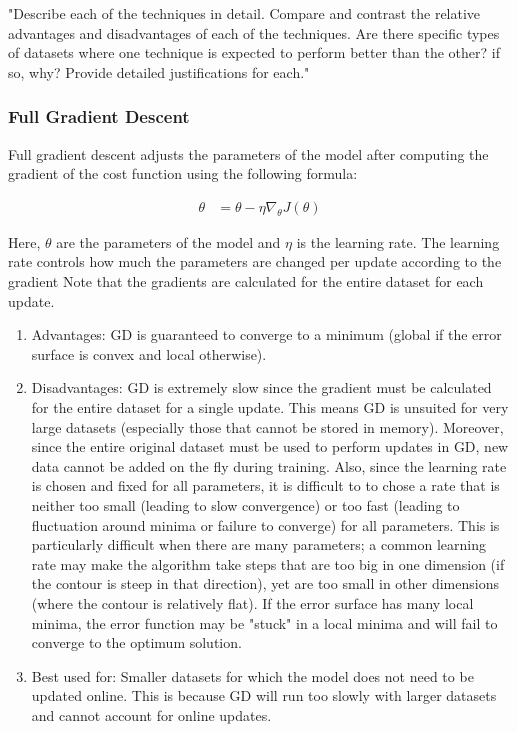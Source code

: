 \documentclass[twoside,11pt]{homework}
\begin{document}
"Describe each of the techniques in detail. Compare and contrast the relative advantages and
disadvantages of each of the techniques. Are there specific types of datasets where one technique is expected to perform better than the other? if so, why? Provide detailed justifications
for each."
\subsubsection{Full Gradient Descent}
Full gradient descent adjusts the parameters of the model after computing the gradient of the cost function using the following formula:

\begin{align*}
	\theta &= \theta - \eta \nabla_\theta J(\theta)
\end{align*}

Here, $\theta$ are the parameters of the model and $\eta$ is the learning rate. The learning rate controls how much the parameters are changed per update according to the gradient Note that the gradients are calculated for the entire dataset for each update.

\begin{enumerate}
	\item Advantages: GD is guaranteed to converge to a minimum (global if the error surface is convex and local otherwise).
	\item Disadvantages: GD is extremely slow since the gradient must be calculated for the entire dataset for a single update. This means GD is unsuited for very large datasets (especially those that cannot be stored in memory). Moreover, since the entire original dataset must be used to perform updates in GD, new data cannot be added on the fly during training. Also, since the learning rate is chosen and fixed for all parameters, it is difficult to to chose a rate that is neither too small (leading to slow convergence) or too fast (leading to fluctuation around minima or failure to converge) for all parameters. This is particularly difficult when there are many parameters; a common learning rate may make the algorithm take steps that are too big in one dimension (if the contour is steep in that direction), yet are too small in other dimensions (where the contour is relatively flat). If the error surface has many local minima, the error function may be "stuck" in a local minima and will fail to converge to the optimum solution. 
	\item Best used for: Smaller datasets for which the model does not need to be updated online. This is because GD will run too slowly with larger datasets and cannot account for online updates. 
\end{enumerate}
\end{document}
